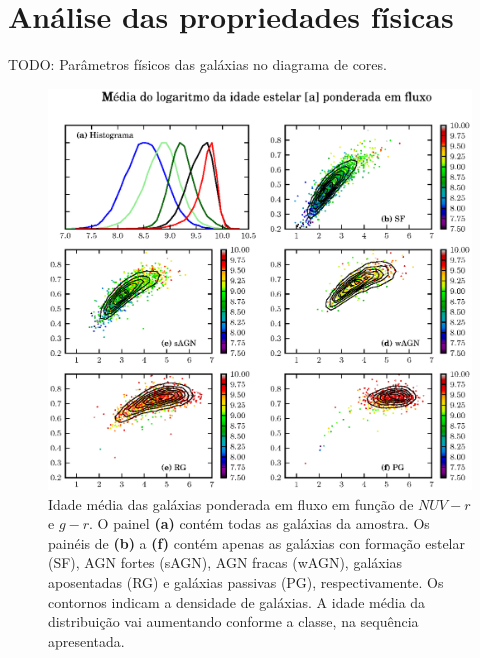 \section{Análise das propriedades físicas}

TODO: Parâmetros físicos das galáxias no diagrama de cores.


\begin{figure}
	\includegraphics{figuras/uvcolor-color-at_flux-byclass.eps}
	\caption[Idade média das galáxias ponderada em fluxo no diagrama cor--cor UV.]
	{Idade média das galáxias ponderada em fluxo em função de $NUV-r$ e $g-r$. O
	painel {\bf (a)} contém todas as galáxias da amostra. Os painéis de {\bf (b)}
	a {\bf (f)} contém apenas as galáxias con formação estelar (SF), AGN fortes
	(sAGN), AGN fracas (wAGN), galáxias aposentadas (RG) e galáxias passivas (PG),
	respectivamente. Os contornos indicam a densidade de galáxias. A idade média da
	distribuição vai aumentando conforme a classe, na sequência apresentada.}
	\label{fig:ATFluxColor}
\end{figure}

